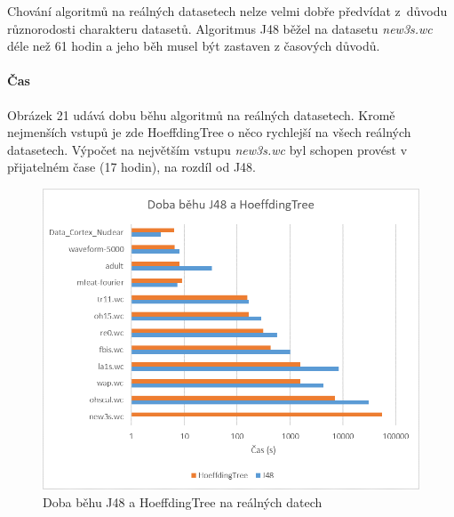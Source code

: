 \documentclass[12pt]{article}
\begin{document}
\newpage
{}
Chování algoritmů na reálných datasetech nelze velmi dobře předvídat z~důvodu různorodosti charakteru datasetů. Algoritmus J48 běžel na datasetu \textit{new3s.wc} déle než 61 hodin a jeho běh musel být zastaven z časových důvodů.
\paragraph{Čas}
Obrázek 21 udává dobu běhu algoritmů na reálných datasetech. Kromě nejmenších vstupů je zde HoeffdingTree o něco rychlejší na všech reálných datasetech. Výpočet na největším vstupu \textit{new3s.wc} byl schopen provést v přijatelném čase (17 hodin), na rozdíl od J48.
\begin{figure}[hbp]
  \centering
  \includegraphics[scale=1]{img/realclasstime.png}
  \caption{Doba běhu J48 a HoeffdingTree na reálných datech}
\end{figure}

\newpage
\end{document}
